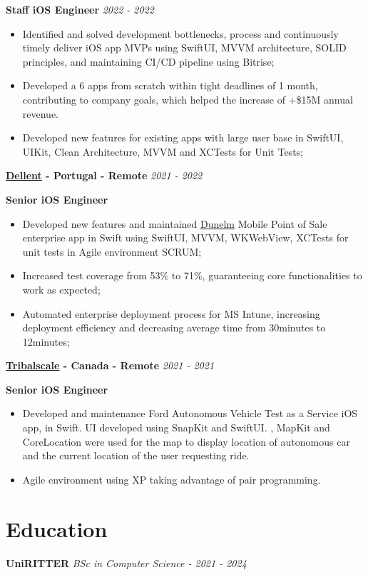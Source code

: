 \documentclass[11pt, oneside]{article}
\begin{document}
\textbf{Staff iOS Engineer}
\hfill
\textit{2022 - 2022}

\begin{itemize}
    \item Identified and solved development bottlenecks, process and continuously timely deliver iOS app MVPs using SwiftUI, MVVM architecture, SOLID principles, and maintaining CI/CD pipeline using Bitrise;
    \item Developed a 6 apps from scratch within tight deadlines of 1 month, contributing to company goals, which helped the increase of +\$15M annual revenue.
    \item Developed new features for existing apps with large user base in SwiftUI, UIKit, Clean Architecture, MVVM and XCTests for Unit Tests;
\end{itemize}

\textbf{\href{https://dellentconsulting.com}{Dellent} - Portugal - Remote}
\hfill
\textit{2021 - 2022}

\textbf{Senior iOS Engineer }

\begin{itemize}
    \item Developed new features and maintained \href{https://www.dunelm.com}{Dunelm} Mobile Point of Sale enterprise app in Swift using SwiftUI, MVVM, WKWebView, XCTests for unit tests in Agile environment SCRUM;
    \item Increased test coverage from 53\% to 71\%, guaranteeing core functionalities to work as expected;
    \item Automated enterprise deployment process for MS Intune, increasing deployment efficiency and decreasing average time from 30minutes to 12minutes;
\end{itemize}

\textbf{\href{https://tribalscale.com}{Tribalscale} - Canada - Remote}
\hfill
\textit{2021 - 2021}

\textbf{Senior iOS Engineer}

\begin{itemize}
    \item Developed and maintenance Ford Autonomous Vehicle Test as a Service iOS app, in Swift. UI developed using SnapKit and SwiftUI. , MapKit and CoreLocation were used for the map to display location of autonomous car and the current location of the user requesting ride.
    \item Agile environment using XP taking advantage of pair programming.
\end{itemize}

\section*{Education}
\textbf{UniRITTER}
\hfill
\textit{BSc in Computer Science - 2021 - 2024}
\end{document}
